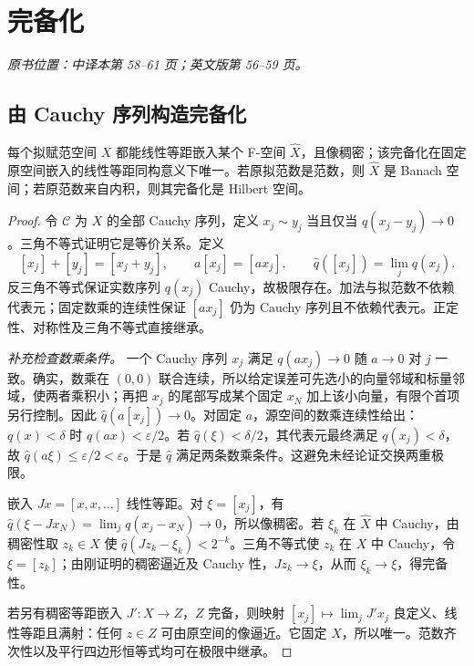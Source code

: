\section{完备化}\label{sec:yosida-01-10}
\noindent\textit{原书位置：中译本第 58--61 页；英文版第 56--59 页。}

\subsection{由 Cauchy 序列构造完备化}
\begin{theorem}[拟赋范空间的完备化]\label{thm:y1-completion}
每个拟赋范空间 $X$ 都能线性等距嵌入某个 F-空间 $\widehat X$，且像稠密；该完备化在固定原空间嵌入的线性等距同构意义下唯一。若原拟范数是范数，则 $\widehat X$ 是 Banach 空间；若原范数来自内积，则其完备化是 Hilbert 空间。
\end{theorem}
\begin{proof}
令 $\mathcal C$ 为 $X$ 的全部 Cauchy 序列，定义 $x_j\sim y_j$ 当且仅当 $q(x_j-y_j)\to0$。三角不等式证明它是等价关系。定义
\[
 [x_j]+[y_j]=[x_j+y_j],\qquad a[x_j]=[ax_j],\qquad
 \widehat q([x_j])=\lim_jq(x_j).
\]
反三角不等式保证实数序列 $q(x_j)$ Cauchy，故极限存在。加法与拟范数不依赖代表元；固定数乘的连续性保证 $[ax_j]$ 仍为 Cauchy 序列且不依赖代表元。正定性、对称性及三角不等式直接继承。

\emph{补充检查数乘条件。} 一个 Cauchy 序列 $x_j$ 满足 $q(ax_j)\to0$ 随 $a\to0$ 对 $j$ 一致。确实，数乘在 $(0,0)$ 联合连续，所以给定误差可先选小的向量邻域和标量邻域，使两者乘积小；再把 $x_j$ 的尾部写成某个固定 $x_N$ 加上该小向量，有限个首项另行控制。因此 $\widehat q(a[x_j])\to0$。对固定 $a$，源空间的数乘连续性给出：$q(x)<\delta$ 时 $q(ax)<\varepsilon/2$。若 $\widehat q(\xi)<\delta/2$，其代表元最终满足 $q(x_j)<\delta$，故 $\widehat q(a\xi)\le\varepsilon/2<\varepsilon$。于是 $\widehat q$ 满足两条数乘条件。这避免未经论证交换两重极限。

嵌入 $Jx=[x,x,\ldots]$ 线性等距。对 $\xi=[x_j]$，有 $\widehat q(\xi-Jx_N)=\lim_jq(x_j-x_N)\to0$，所以像稠密。若 $\xi_k$ 在 $\widehat X$ 中 Cauchy，由稠密性取 $z_k\in X$ 使 $\widehat q(Jz_k-\xi_k)<2^{-k}$。三角不等式使 $z_k$ 在 $X$ 中 Cauchy，令 $\xi=[z_k]$；由刚证明的稠密逼近及 Cauchy 性，$Jz_k\to\xi$，从而 $\xi_k\to\xi$，得完备性。

若另有稠密等距嵌入 $J':X\to Z$，$Z$ 完备，则映射 $[x_j]\mapsto\lim_jJ'x_j$ 良定义、线性等距且满射：任何 $z\in Z$ 可由原空间的像逼近。它固定 $X$，所以唯一。范数齐次性以及平行四边形恒等式均可在极限中继承。
\end{proof}

